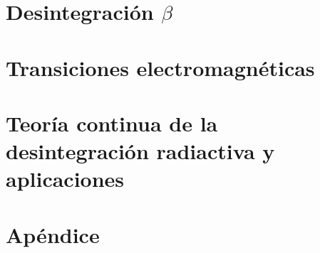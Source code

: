 
\section{Desintegración $\beta$}

\section{Transiciones electromagnéticas}

\section{Teoría continua de la desintegración radiactiva y aplicaciones}

\section{Apéndice}